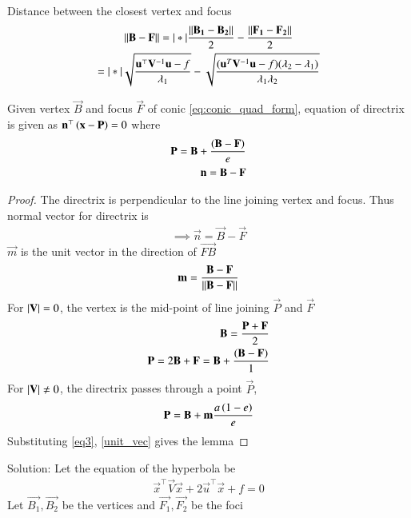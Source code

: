 \documentclass[journal,12pt,twocolumn]{IEEEtran}
\begin{document}
\begin{lemma}
Distance between the closest vertex and focus 
\begin{multline}
    \label{eq3} \lVert\mathbf{B}-\mathbf{F}\rVert = \vert*\vert{ \frac{\lVert\mathbf{B_1}-\mathbf{B_2}\rVert}{2} - \frac{\lVert\mathbf{F_1}-\mathbf{F_2}\rVert}{2}}\\
    = \vert*\vert{\sqrt{\frac{\mathbf{u}^{\top}\mathbf{V}^{-1}\mathbf{u} -f}{\lambda_1}} - \sqrt{\frac{(\mathbf{u}^T\mathbf{V}^{-1}\mathbf{u}-f)(\lambda_2-\lambda_1)}{\lambda_1\lambda_2}}}
\end{multline}
\end{lemma}
\begin{lemma}
Given vertex $\vec{B}$ and focus $\vec{F}$ of conic \eqref{eq:conic_quad_form}, equation of directrix is given as $\mathbf{n}^{\top}\left(\mathbf{x} - \mathbf{P}\right) = 0$ where
\begin{align}
    \mathbf{P} = \mathbf{B} + \frac{\left(\mathbf{B}-\mathbf{F}\right)}{e}\\
    \mathbf{n} = \mathbf{B}-\mathbf{F}
\end{align}
\end{lemma}
\begin{proof}
The directrix is perpendicular to the line joining vertex and focus. Thus normal vector for directrix is
\begin{align}
    \implies \vec{n} = \vec{B}-\vec{F}
\end{align}
$\vec{m}$ is the unit vector in the direction of $\vec{FB}$
\begin{align}
    \label{unit_vec} \mathbf{m} = \frac{\mathbf{B}-\mathbf{F}}{\lVert\mathbf{B}-\mathbf{F}\rVert}
\end{align}
For $\vert\mathbf{V}\vert = 0$, the vertex is the mid-point of line joining $\vec{P}$ and $\vec{F}$
\begin{align}
    \mathbf{B} = \frac{\mathbf{P}+\mathbf{F}}{2}\\
    \mathbf{P} = 2\mathbf{B} + \mathbf{F} = \mathbf{B} + \frac{\left(\mathbf{B}-\mathbf{F}\right)}{1}
\end{align}
For $\vert\mathbf{V}\vert \ne 0$, the directrix passes through a point $\vec{P}$,
\begin{align}
    \mathbf{P} = \mathbf{B} + \mathbf{m}\frac{a\left(1-e\right)}{e}
\end{align}
Substituting \eqref{eq3}, \eqref{unit_vec} gives the lemma
\end{proof}
Solution: Let the equation of the hyperbola be
\begin{align}
     \vec{x}^{\top}\vec{V}\vec{x}+2\vec{u}^{\top}\vec{x}+f=0
\end{align}
Let $\vec{B_1}, \vec{B_2}$ be the vertices and $\vec{F_1}, \vec{F_2}$ be the foci
\end{document}
